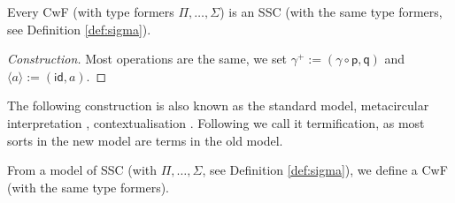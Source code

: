 \documentclass[sigplan,10pt,anonymous,review]{acmart}\settopmatter{printfolios=true,printccs=false,printacmref=false}
\newcommand{\p}{\mathsf{p}}
\newcommand{\q}{\mathsf{q}}
\newcommand{\id}{\mathsf{id}}
\begin{document}
\begin{problem}
  Every CwF (with type formers $\Pi, \dots, \Sigma$) is an SSC (with
  the same type formers, see Definition \ref{def:sigma}).
\end{problem}
\begin{proof}[Construction]
  Most operations are the same, we set $\gamma^+ :=
  (\gamma\circ\p,\q)$ and $\langle a\rangle := (\id,a)$.
\end{proof}
The following construction is also known as the standard model,
metacircular interpretation \cite{DBLP:conf/popl/AltenkirchK16},
contextualisation \cite{DBLP:conf/fscd/BocquetKS23}. Following
\cite{kaposi-shallow} we call it termification, as most sorts in the
new model are terms in the old model.
\begin{problem}[Termification]
  From a model of SSC (with $\Pi, \dots, \Sigma$, see Definition
  \ref{def:sigma}), we define a CwF (with the same type formers).
\end{problem}
\end{document}
